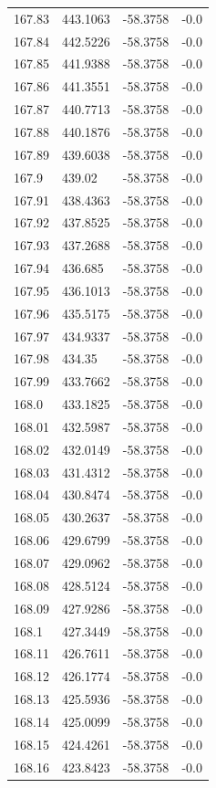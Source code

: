 \begin{table}[H]
\begin{tabular}{llll}
167.83 & 443.1063 & -58.3758 & -0.0 \\
167.84 & 442.5226 & -58.3758 & -0.0 \\
167.85 & 441.9388 & -58.3758 & -0.0 \\
167.86 & 441.3551 & -58.3758 & -0.0 \\
167.87 & 440.7713 & -58.3758 & -0.0 \\
167.88 & 440.1876 & -58.3758 & -0.0 \\
167.89 & 439.6038 & -58.3758 & -0.0 \\
167.9 & 439.02 & -58.3758 & -0.0 \\
167.91 & 438.4363 & -58.3758 & -0.0 \\
167.92 & 437.8525 & -58.3758 & -0.0 \\
167.93 & 437.2688 & -58.3758 & -0.0 \\
167.94 & 436.685 & -58.3758 & -0.0 \\
167.95 & 436.1013 & -58.3758 & -0.0 \\
167.96 & 435.5175 & -58.3758 & -0.0 \\
167.97 & 434.9337 & -58.3758 & -0.0 \\
167.98 & 434.35 & -58.3758 & -0.0 \\
167.99 & 433.7662 & -58.3758 & -0.0 \\
168.0 & 433.1825 & -58.3758 & -0.0 \\
168.01 & 432.5987 & -58.3758 & -0.0 \\
168.02 & 432.0149 & -58.3758 & -0.0 \\
168.03 & 431.4312 & -58.3758 & -0.0 \\
168.04 & 430.8474 & -58.3758 & -0.0 \\
168.05 & 430.2637 & -58.3758 & -0.0 \\
168.06 & 429.6799 & -58.3758 & -0.0 \\
168.07 & 429.0962 & -58.3758 & -0.0 \\
168.08 & 428.5124 & -58.3758 & -0.0 \\
168.09 & 427.9286 & -58.3758 & -0.0 \\
168.1 & 427.3449 & -58.3758 & -0.0 \\
168.11 & 426.7611 & -58.3758 & -0.0 \\
168.12 & 426.1774 & -58.3758 & -0.0 \\
168.13 & 425.5936 & -58.3758 & -0.0 \\
168.14 & 425.0099 & -58.3758 & -0.0 \\
168.15 & 424.4261 & -58.3758 & -0.0 \\
168.16 & 423.8423 & -58.3758 & -0.0 \\

\end{tabular}
\end{table}
